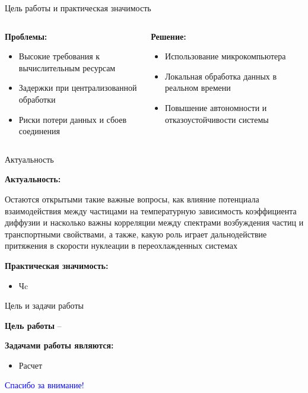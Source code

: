 \documentclass{beamer} %
\begin{document}
\begin{frame}{Цель работы и практическая значимость}
  \begin{columns}[T]
    \begin{column}{0.45\textwidth}
      \textbf{Проблемы:}
      \begin{itemize}
        \item Высокие требования к вычислительным ресурсам
        \item Задержки при централизованной обработки
        \item Риски потери данных и сбоев соединения
      \end{itemize}
    \end{column}
    \begin{column}{0.45\textwidth}
      \textbf{Решение:}
      \begin{itemize}
        \item Использование микрокомпьютера
        \item Локальная обработка данных в реальном времени
        \item Повышение автономности и отказоустойчивости системы
      \end{itemize}
    \end{column}
  \end{columns}
\end{frame}



\begin{frame}{Актуальность}
  \footnotesize{

    \textbf{Актуальность:}

    Остаются открытыми такие важные вопросы, как влияние потенциала взаимодействия между частицами на температурную зависимость коэффициента диффузии и насколько важны корреляции между спектрами возбуждения частиц и транспортными свойствами, а также, какую роль играет дальнодействие притяжения в скорости нуклеации в переохлажденных системах

    \vspace{1cm}

    \textbf{Практическая значимость:}

    \begin{itemize}
    \item Чc
    \end{itemize}
  }
\end{frame}




\begin{frame}{Цель и задачи работы}
  \footnotesize{

    \textbf{Цель работы} -- 

    \vspace{0.5cm}

    \textbf{Задачами работы являются:}
    \begin{itemize}
    \item Расчет
    \end{itemize}
  }
\end{frame}


\begin{frame}
  \centering \Huge \textcolor{blue}{Спасибо за внимание!}
\end{frame}
\end{document}
